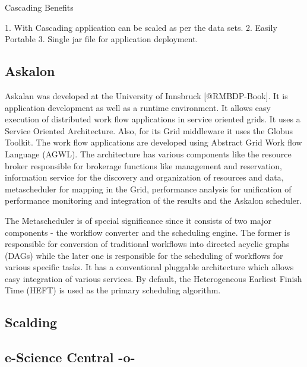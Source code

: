 Cascading Benefits
    
1. With Cascading application can be scaled as per the data sets.
2. Easily Portable
3. Single jar file for application deployment.



\subsection{Askalon}

Askalan was developed at the University of
Innsbruck [@RMBDP-Book].  It is application development as well as
a runtime environment. It allows easy execution of distributed work
flow applications in service oriented grids. It uses a Service
Oriented Architecture. Also, for its Grid middleware it uses the
Globus Toolkit. The work flow applications are developed using
Abstract Grid Work flow Language (AGWL). The architecture has various
components like the resource broker responsible for brokerage
functions like management and reservation, information service for the
discovery and organization of resources and data, metascheduler for
mapping in the Grid, performance analysis for unification of
performance monitoring and integration of the results and the Askalon
scheduler.

The Metascheduler is of special significance since it consists of two
major components - the workflow converter and the scheduling
engine. The former is responsible for conversion of traditional
workflows into directed acyclic graphs (DAGs) while the later one is
responsible for the scheduling of workflows for various specific
tasks. It has a conventional pluggable architecture which allows easy
integration of various services. By default, the Heterogeneous
Earliest Finish Time (HEFT) is used as the primary scheduling
algorithm.

\subsection{Scalding}

\subsection{e-Science Central -o-}

